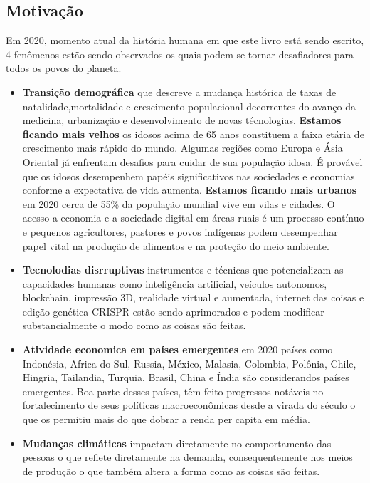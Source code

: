 \documentclass[
]{article}
\begin{document}
\hypertarget{motivauxe7uxe3o}{%
\subsection*{Motivação}\label{motivauxe7uxe3o}}

Em 2020, momento atual da história humana em que este livro está sendo escrito, 4 fenômenos estão sendo observados os quais podem se tornar desafiadores para todos os povos do planeta.

\begin{itemize}
\item
  \textbf{Transição demográfica} que descreve a mudança histórica de taxas de natalidade,mortalidade e crescimento populacional decorrentes do avanço da medicina, urbanização e desenvolvimento de novas técnologias. \textbf{Estamos ficando mais velhos} os idosos acima de 65 anos constituem a faixa etária de crescimento mais rápido do mundo. Algumas regiões como Europa e Ásia Oriental já enfrentam desafios para cuidar de sua população idosa.
  É provável que os idosos desempenhem papéis significativos nas sociedades e economias conforme a expectativa de vida aumenta. \textbf{Estamos ficando mais urbanos} em 2020 cerca de 55\% da população mundial vive em vilas e cidades. O acesso a economia e a sociedade digital em áreas ruais é um processo contínuo e pequenos agricultores, pastores e povos indígenas podem desempenhar papel vital na produção de alimentos e na proteção do meio ambiente.
\item
  \textbf{Tecnolodias disrruptivas} instrumentos e técnicas que potencializam as capacidades humanas como inteligência artificial, veículos autonomos, blockchain, impressão 3D, realidade virtual e aumentada, internet das coisas e edição genética CRISPR estão sendo aprimorados e podem modificar substancialmente o modo como as coisas são feitas.
\item
  \textbf{Atividade economica em países emergentes} em 2020 países como Indonésia, Africa do Sul, Russia, México, Malasia, Colombia, Polônia, Chile, Hingria, Tailandia, Turquia, Brasil, China e Índia são considerandos países emergentes. Boa parte desses países, têm feito progressos notáveis no fortalecimento de seus políticas macroeconômicas desde a virada do século o que os permitiu mais do que dobrar a renda per capita em média.
\item
  \textbf{Mudanças climáticas} impactam diretamente no comportamento das pessoas o que reflete diretamente na demanda, consequentemente nos meios de produção o que também altera a forma como as coisas são feitas.
\end{itemize}
\end{document}
